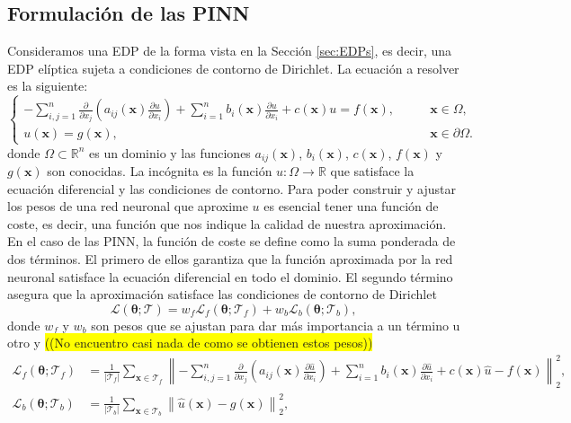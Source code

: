 \documentclass[a4paper,11pt,spanish, twoside, leqno]{tfg-uam}
\theoremstyle{definition}
\begin{document}
\subsection{Formulación de las PINN}
Consideramos una EDP de la forma vista en la Sección \ref{sec:EDPs}, es decir, una EDP elíptica sujeta a condiciones de contorno de Dirichlet. La ecuación a resolver es la siguiente: 
\begin{equation} 
    \begin{cases} -\sum_{i,j=1}^{n} \frac{\partial}{\partial x_j}\left( a_{ij}(\mathbf{x})\frac{\partial u}{\partial x_i}\right) + \sum_{i=1}^{n} b_i(\mathbf{x})\frac{\partial u}{\partial x_i} + c(\mathbf{x})u = f(\mathbf{x}), &\qquad \mathbf{x}\in\Omega,\\ u(\mathbf{x}) = g(\mathbf{x}), &\qquad \mathbf{x}\in\partial\Omega. 
    \end{cases} 
\end{equation} 
donde $\Omega \subset \mathbb{R}^n$ es un dominio y las funciones $a_{ij}(\mathbf{x})$, $b_i(\mathbf{x})$, $c(\mathbf{x})$, $f(\mathbf{x})$ y $g(\mathbf{x})$ son conocidas. La incógnita es la función $u: \Omega \to \mathbb{R}$ que satisface la ecuación diferencial y las condiciones de contorno. Para poder construir y ajustar los pesos de una red neuronal que aproxime $u$ es esencial tener una función de coste, es decir, una función que nos indique la calidad de nuestra aproximación. En el caso de las PINN, la función de coste se define como la suma ponderada de dos términos. El primero de ellos garantiza que la función aproximada por la red neuronal satisface la ecuación diferencial en todo el dominio. El segundo término asegura que la aproximación satisface las condiciones de contorno de Dirichlet
\begin{equation} \label{eq:L_PINN}
    \mathcal{L}(\boldsymbol{\theta}; \mathcal{T}) = w_f \mathcal{L}_f(\boldsymbol{\theta}; \mathcal{T}_f) + w_b \mathcal{L}_b(\boldsymbol{\theta}; \mathcal{T}_b),
\end{equation}
donde $w_f$ y $w_b$ son pesos que se ajustan para dar más importancia a un término u otro y \colorbox{yellow}{((No encuentro casi nada de como se obtienen estos pesos))}
\begin{align*}
    \mathcal{L}_f(\boldsymbol{\theta}; \mathcal{T}_f) &= \frac{1}{|\mathcal{T}_f|} \sum_{\mathbf{x} \in \mathcal{T}_f} \left\| -\sum_{i,j=1}^{n} \frac{\partial}{\partial x_j}\left( a_{ij}(\mathbf{x})\frac{\partial \hat{u}}{\partial x_i}\right) + \sum_{i=1}^{n} b_i(\mathbf{x})\frac{\partial \hat{u}}{\partial x_i} + c(\mathbf{x})\hat{u} - f(\mathbf{x}) \right\|_2^2, \\ 
    \mathcal{L}_b(\boldsymbol{\theta}; \mathcal{T}_b) &= \frac{1}{|\mathcal{T}_b|} \sum_{\mathbf{x} \in \mathcal{T}_b} \left\| \hat{u} (\mathbf{x}) - g(\mathbf{x})\right\|_2^2,
\end{align*}
\end{document}
